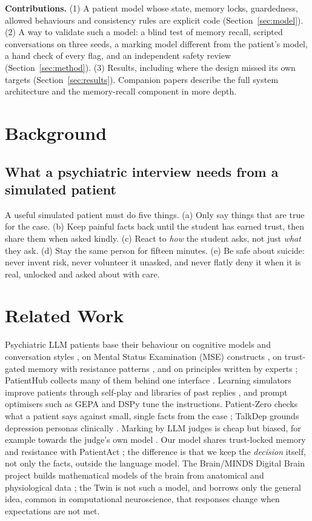 \documentclass[conference]{IEEEtran}
\begin{document}
\textbf{Contributions.} (1) A patient model whose state, memory locks, guardedness, allowed behaviours and consistency rules are explicit code
(Section~\ref{sec:model}). (2) A way to validate such a model: a blind test of memory recall, scripted conversations on three seeds, a
marking model different from the patient's model, a hand check of every flag, and an independent safety review
(Section~\ref{sec:method}). (3) Results, including where the design missed its own targets (Section~\ref{sec:results}). Companion papers
describe the full system architecture and the memory-recall component in more depth.

\section{Background}
\subsection{What a psychiatric interview needs from a simulated patient}
A useful simulated patient must do five things. (a) Only say things that are true for the case. (b) Keep painful facts back until the student has earned trust, then share them when asked kindly. (c) React to \emph{how} the student asks, not just \emph{what} they ask. (d) Stay the same person for fifteen minutes. (e) Be safe about suicide: never invent risk, never volunteer it unasked, and never flatly deny it when it is real, unlocked and asked about with care.

\section{Related Work}
Psychiatric LLM patients base their behaviour on cognitive models and conversation styles \cite{wang2024patient}, on Mental Status
Examination (MSE) constructs \cite{lee2025psyche}, on trust-gated memory with resistance patterns \cite{sabour2026patientact}, and on
principles written by experts \cite{louie2024roleplaydoh}; PatientHub collects many of them behind one interface \cite{sabour2026patienthub}.
Learning simulators improve patients through self-play and libraries of past replies \cite{du2024llms,almansoori2025selfevolving,li2024agent},
and prompt optimisers such as GEPA \cite{agrawal2025gepa} and DSPy \cite{khattab2023dspy} tune the instructions. Patient-Zero checks what a
patient says against small, single facts from the case \cite{lai2025patientzero}; TalkDep grounds depression personas clinically
\cite{wang2025talkdep}. Marking by LLM judges is cheap but biased, for example towards the judge's own model \cite{zheng2023judging,zhou2025personaeval}.
Our model shares trust-locked memory and resistance with PatientAct \cite{sabour2026patientact}; the difference is that we keep the
\emph{decision} itself, not only the facts, outside the language model. The Brain/MINDS Digital Brain project builds mathematical models of the
brain from anatomical and physiological data \cite{brainminds}; the Twin is not such a model, and borrows only the general idea, common in
computational neuroscience, that responses change when expectations are not met.
\end{document}
